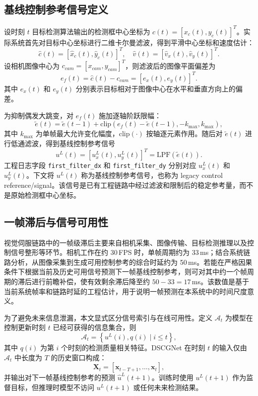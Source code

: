 \documentclass[journal]{IEEEtran}
\begin{document}
\subsection{基线控制参考信号定义}
设时刻 $t$ 目标检测算法输出的检测框中心坐标为 $c(t)=[x_c(t),y_c(t)]^T$。实际系统首先对目标中心坐标进行二维卡尔曼滤波，得到平滑中心坐标和速度估计：
\begin{equation}
\hat{c}(t)=[\hat{x}_c(t),\hat{y}_c(t)]^T,\quad
\hat{v}(t)=[\hat{v}_x(t),\hat{v}_y(t)]^T .
\end{equation}
设相机图像中心为 $c_{cam}=[x_{cam},y_{cam}]^T$，则滤波后的图像平面偏差为
\begin{equation}
e_f(t)=\hat{c}(t)-c_{cam}=[e_x(t),e_y(t)]^T .
\end{equation}
其中 $e_x(t)$ 和 $e_y(t)$ 分别表示目标相对于图像中心在水平和垂直方向上的偏差。

为抑制偶发大跳变，对 $e_f(t)$ 施加逐轴阶跃限幅：
\begin{equation}
\tilde{e}(t)=\tilde{e}(t-1)+\mathrm{clip}\!\left(e_f(t)-\tilde{e}(t-1),-k_{\max},k_{\max}\right),
\end{equation}
其中 $k_{\max}$ 为单帧最大允许变化幅度，$\mathrm{clip}(\cdot)$ 按轴逐元素作用。随后对 $\tilde{e}(t)$ 进行低通滤波，得到基线控制参考信号
\begin{equation}
u^L(t)=[u_x^L(t),u_y^L(t)]^T=\mathrm{LPF}(\tilde{e}(t)).
\end{equation}
工程日志字段 \texttt{first\_filter\_dx} 和 \texttt{first\_filter\_dy} 分别对应 $u_x^L(t)$ 和 $u_y^L(t)$。下文将 $u^L(t)$ 称为基线控制参考信号，也称为 legacy control reference/signal。该信号是已有工程链路中经过滤波和限制后的稳定参考量，而不是原始检测框中心坐标。

\subsection{一帧滞后与信号可用性}
视觉伺服链路中的一帧级滞后主要来自相机采集、图像传输、目标检测推理以及控制信号整形等环节。相机工作在约 30\,FPS 时，单帧周期约为 33\,ms；结合系统链路分析，从图像采集到生成可用控制参考的综合时延约为 50\,ms。若能在严格因果条件下根据当前及历史可用信号预测下一帧基线控制参考，则可对其中约一个帧周期的滞后进行前瞻补偿，使有效剩余滞后降至约 $50-33=17$\,ms。该数值是基于当前系统帧率和链路时延的工程估计，用于说明一帧预测在本系统中的时间尺度意义。

为了避免未来信息泄漏，本文显式区分信号索引与在线可用性。定义 $\mathcal{A}_t$ 为模型在控制更新时刻 $t$ 已经可获得的信息集合，则
\begin{equation}
\mathcal{A}_t=\left\{u^L(i),q(i)\mid i\leq t\right\},
\end{equation}
其中 $q(i)$ 为第 $i$ 个时刻的检测质量相关特征。DSCGNet 在时刻 $t$ 的输入仅由 $\mathcal{A}_t$ 中长度为 $T$ 的历史窗口构成：
\begin{equation}
\mathbf{X}_{t}=[\mathbf{x}_{t-T+1},\ldots,\mathbf{x}_{t}],
\end{equation}
并输出对下一帧基线控制参考的预测 $\hat{u}^L(t+1)$。训练时使用 $u^L(t+1)$ 作为监督目标，但推理时模型不访问 $u^L(t+1)$ 或任何未来检测结果。
\end{document}
